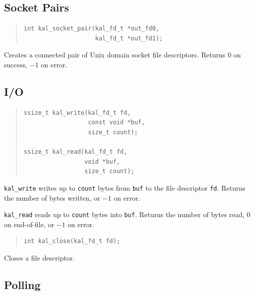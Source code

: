 \documentclass[11pt,twoside]{article}
\begin{document}
\subsection{Socket Pairs}

\begin{quote}
\begin{verbatim}
int kal_socket_pair(kal_fd_t *out_fd0,
                    kal_fd_t *out_fd1);
\end{verbatim}
\end{quote}

Creates a connected pair of Unix domain socket file descriptors.
Returns $0$ on success, $-1$ on error.

\subsection{I/O}

\begin{quote}
\begin{verbatim}
ssize_t kal_write(kal_fd_t fd,
                  const void *buf,
                  size_t count);

ssize_t kal_read(kal_fd_t fd,
                 void *buf,
                 size_t count);
\end{verbatim}
\end{quote}

{\tt kal\_write} writes up to {\tt count} bytes from {\tt buf} to
the file descriptor {\tt fd}.  Returns the number of bytes written,
or $-1$ on error.

{\tt kal\_read} reads up to {\tt count} bytes into {\tt buf}.
Returns the number of bytes read, $0$ on end-of-file, or $-1$ on
error.

\begin{quote}
\begin{verbatim}
int kal_close(kal_fd_t fd);
\end{verbatim}
\end{quote}

Closes a file descriptor.

\subsection{Polling}
\end{document}
